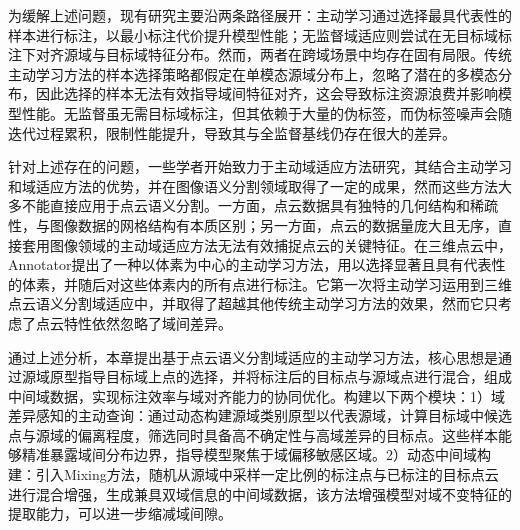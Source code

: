 为缓解上述问题，现有研究主要沿两条路径展开：主动学习通过选择最具代表性的样本进行标注，以最小标注代价提升模型性能；无监督域适应则尝试在无目标域标注下对齐源域与目标域特征分布。然而，两者在跨域场景中均存在固有局限。传统主动学习方法的样本选择策略都假定在单模态源域分布上，忽略了潜在的多模态分布，因此选择的样本无法有效指导域间特征对齐，这会导致标注资源浪费并影响模型性能。无监督虽无需目标域标注，但其依赖于大量的伪标签，而伪标签噪声会随迭代过程累积，限制性能提升，导致其与全监督基线仍存在很大的差异。

针对上述存在的问题，一些学者开始致力于主动域适应方法研究，其结合主动学习和域适应方法的优势，并在图像语义分割领域取得了一定的成果，然而这些方法大多不能直接应用于点云语义分割。一方面，点云数据具有独特的几何结构和稀疏性，与图像数据的网格结构有本质区别；另一方面，点云的数据量庞大且无序，直接套用图像领域的主动域适应方法无法有效捕捉点云的关键特征。在三维点云中，Annotator提出了一种以体素为中心的主动学习方法，用以选择显著且具有代表性的体素，并随后对这些体素内的所有点进行标注。它第一次将主动学习运用到三维点云语义分割域适应中，并取得了超越其他传统主动学习方法的效果，然而它只考虑了点云特性依然忽略了域间差异。


通过上述分析，本章提出基于点云语义分割域适应的主动学习方法，核心思想是通过源域原型指导目标域上点的选择，并将标注后的目标点与源域点进行混合，组成中间域数据，实现标注效率与域对齐能力的协同优化。构建以下两个模块：1）域差异感知的主动查询：通过动态构建源域类别原型以代表源域，计算目标域中候选点与源域的偏离程度，筛选同时具备高不确定性与高域差异的目标点。这些样本能够精准暴露域间分布边界，指导模型聚焦于域偏移敏感区域。2）动态中间域构建：引入Mixing方法，随机从源域中采样一定比例的标注点与已标注的目标点云进行混合增强，生成兼具双域信息的中间域数据，该方法增强模型对域不变特征的提取能力，可以进一步缩减域间隙。

